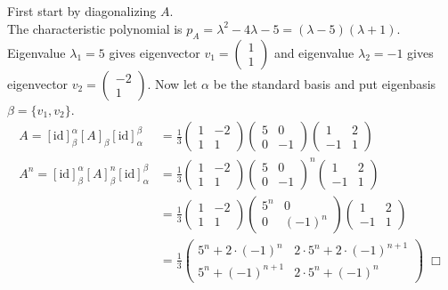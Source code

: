 \documentclass{article}
\begin{document}
\section{}
First start by diagonalizing $A$.\\
The characteristic polynomial is $p_A = \lambda^2 - 4\lambda -5 = (\lambda - 5)(\lambda + 1)$. Eigenvalue $\lambda_1 = 5$ gives eigenvector $v_1 = \left( \begin{matrix} 1\\1 \end{matrix} \right)$ and eigenvalue $\lambda_2 = -1$ gives eigenvector $v_2 = \left( \begin{matrix} -2\\1 \end{matrix} \right)$. Now let $\alpha$ be the standard basis and put eigenbasis $\beta = \{v_1,v_2\}$.
\begin{equation*}
    \begin{split}
    A = [\textrm{id}]_\beta^\alpha [A]_\beta [\textrm{id}]^\beta_\alpha &=
    \frac{1}{3}\left( \begin{matrix} 1 & -2 \\ 1 & 1 \end{matrix} \right) \left( \begin{matrix} 5 & 0 \\ 0 & -1 \end{matrix} \right) \left( \begin{matrix} 1 & 2 \\ -1 & 1 \end{matrix} \right)\\
    A^n = [\textrm{id}]_\beta^\alpha [A]_\beta^n [\textrm{id}]^\beta_\alpha &=
    \frac{1}{3}\left( \begin{matrix} 1 & -2 \\ 1 & 1 \end{matrix} \right) \left( \begin{matrix} 5 & 0 \\ 0 & -1 \end{matrix} \right)^n \left( \begin{matrix} 1 & 2 \\ -1 & 1 \end{matrix} \right)\\
    &= \frac{1}{3}\left( \begin{matrix} 1 & -2 \\ 1 & 1 \end{matrix} \right) \left( \begin{matrix} 5^n & 0 \\ 0 & (-1)^n \end{matrix} \right) \left( \begin{matrix} 1 & 2 \\ -1 & 1 \end{matrix} \right)\\
    &= \frac{1}{3} \left( \begin{matrix} 5^n + 2\cdot(-1)^n & 2\cdot5^n + 2\cdot (-1)^{n+1} \\ 5^n + (-1)^{n+1} & 2\cdot5^n + (-1)^n \end{matrix} \right) \; \Box
    \end{split}
 \end{equation*}
\end{document}
